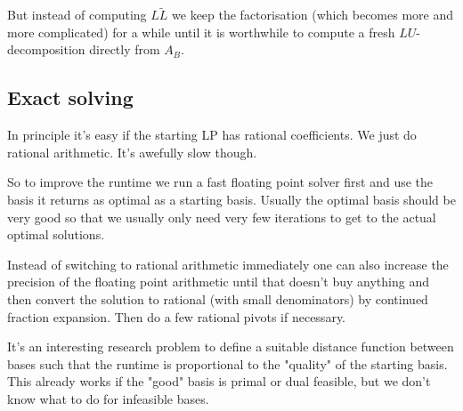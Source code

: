 But instead of computing $L\tilde L$ we keep the factorisation (which becomes more and more complicated) for a while until it is worthwhile to compute a fresh $LU$-decomposition directly from $A_B$.

\subsection{Exact solving}

In principle it's easy if the starting LP has rational coefficients. We just do rational arithmetic. It's awefully slow though. 

So to improve the runtime we run a fast floating point solver first and use the basis it returns as optimal as a starting basis. Usually the optimal basis should be very good so that we usually only need very few iterations to get to the actual optimal solutions.

Instead of switching to rational arithmetic immediately one can also increase the precision of the floating point arithmetic until that doesn't buy anything and then convert the solution to rational (with small denominators) by continued fraction expansion. Then do a few rational pivots if necessary.

It's an interesting research problem to define a suitable distance function between bases such that the runtime is proportional to the "quality" of the starting basis. This already works if the "good" basis is primal or dual feasible, but we don't know what to do for infeasible bases.